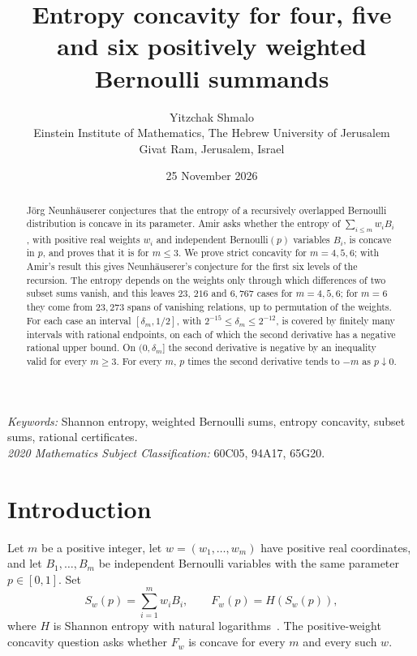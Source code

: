\documentclass[11pt,a4paper]{article}
\title{Entropy concavity for four, five and six positively weighted Bernoulli summands}
\author{Yitzchak Shmalo\\[0.4em]
\small Einstein Institute of Mathematics, The Hebrew University of Jerusalem\\
\small Givat Ram, Jerusalem, Israel}
\date{25 November 2026}
\numberwithin{equation}{section}
\theoremstyle{remark}
\begin{document}
\maketitle
\thispagestyle{fancy}

\begin{abstract}
J\"org Neunh\"auserer conjectures that the entropy of a recursively overlapped Bernoulli distribution is concave in its parameter. Amir asks whether the entropy of $\sum_{i\le m}w_iB_i$, with positive real weights $w_i$ and independent Bernoulli$(p)$ variables $B_i$, is concave in $p$, and proves that it is for $m\le3$. We prove strict concavity for $m=4,5,6$; with Amir's result this gives Neunh\"auserer's conjecture for the first six levels of the recursion. The entropy depends on the weights only through which differences of two subset sums vanish, and this leaves $23$, $216$ and $6{,}767$ cases for $m=4,5,6$; for $m=6$ they come from $23{,}273$ spans of vanishing relations, up to permutation of the weights. For each case an interval $[\delta_m,1/2]$, with $2^{-15}\le\delta_m\le2^{-12}$, is covered by finitely many intervals with rational endpoints, on each of which the second derivative has a negative rational upper bound. On $(0,\delta_m]$ the second derivative is negative by an inequality valid for every $m\ge3$. For every $m$, $p$ times the second derivative tends to $-m$ as $p\downarrow0$.
\end{abstract}

\noindent\textit{Keywords:} Shannon entropy, weighted Bernoulli sums, entropy concavity, subset sums, rational certificates.\\
\textit{2020 Mathematics Subject Classification:} 60C05, 94A17, 65G20.

\section{Introduction}\label{sec:intro}

Let $m$ be a positive integer, let $w=(w_1,\ldots,w_m)$ have positive real coordinates, and let $B_1,\ldots,B_m$ be independent Bernoulli variables with the same parameter $p\in[0,1]$. Set
\begin{equation}\label{eq:sum}
 S_w(p)=\sum_{i=1}^m w_i B_i,\qquad F_w(p)=H(S_w(p)),
\end{equation}
where $H$ is Shannon entropy with natural logarithms~\cite{Shannon}.
The positive-weight concavity question asks whether $F_w$ is concave for every $m$ and every such $w$.
\end{document}
